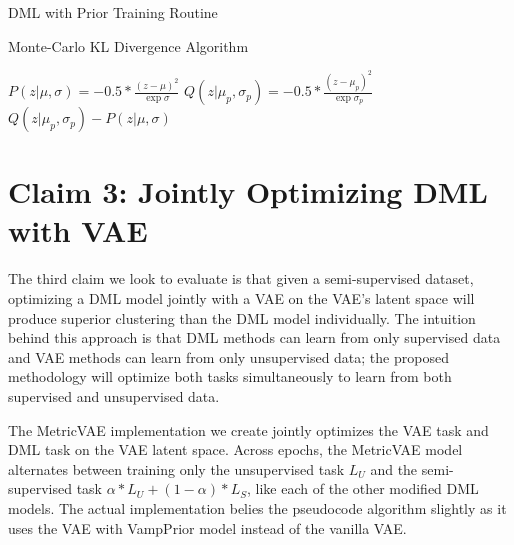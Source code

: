 \documentclass[./dissertation.tex]{subfiles}
\begin{document}
    \begin{algorithm}
    \caption{DML with Prior Training Routine}\label{alg:two}
    \end{algorithm}
    \begin{algorithm}
    \caption{Monte-Carlo KL Divergence Algorithm}\label{alg:two}
    $P(z|\mu, \sigma) = -0.5 * \frac{(z - \mu)^{2}}{\exp{\sigma}}$\;
    $Q(z|\mu_{p}, \sigma_{p}) = -0.5 * \frac{(z - \mu_{p})^{2}}{\exp{\sigma_{p}}}$\;
    \Return $Q(z|\mu_{p}, \sigma_{p}) - P(z|\mu, \sigma)$
    \end{algorithm}
    
    \section{Claim 3: Jointly Optimizing DML with VAE}
    The third claim we look to evaluate is that given a semi-supervised dataset, optimizing a DML model jointly with a VAE on the VAE’s latent space will produce superior clustering than the DML model individually. The intuition behind this approach is that DML methods can learn from only supervised data and VAE methods can learn from only unsupervised data; the proposed methodology will optimize both tasks simultaneously to learn from both supervised and unsupervised data.
    
    The MetricVAE implementation we create jointly optimizes the VAE task and DML task on the VAE latent space. Across epochs, the MetricVAE model alternates between training only the unsupervised task $L_{U}$ and the semi-supervised task $\alpha * L_{U} + (1 - \alpha) * L_{S}$, like each of the other modified DML models. The actual implementation belies the pseudocode algorithm slightly as it uses the VAE with VampPrior model instead of the vanilla VAE.  
    
\end{document}

